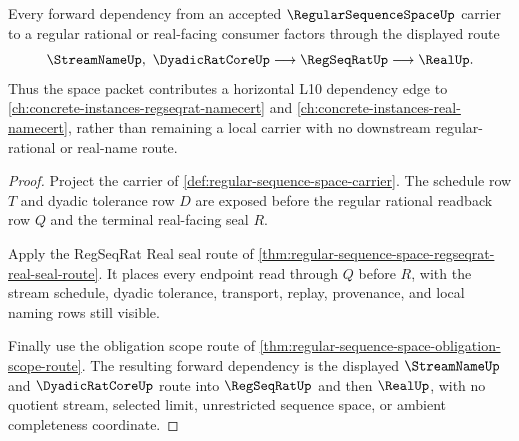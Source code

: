 \begin{theorem}
\label{thm:regular-sequence-space-regseqrat-forward-route}
Every forward dependency from an accepted $\RegularSequenceSpaceUp$ carrier to a regular rational or real-facing consumer factors through the displayed route
$$
\StreamNameUp,\ \DyadicRatCoreUp \longrightarrow \RegSeqRatUp \longrightarrow \RealUp .
$$
Thus the space packet contributes a horizontal L10 dependency edge to \autoref{ch:concrete-instances-regseqrat-namecert} and \autoref{ch:concrete-instances-real-namecert}, rather than remaining a local carrier with no downstream regular-rational or real-name route.
\end{theorem}
\begin{proof}
Project the carrier of \autoref{def:regular-sequence-space-carrier}. The schedule row $T$ and dyadic tolerance row $D$ are exposed before the regular rational readback row $Q$ and the terminal real-facing seal $R$.

Apply the RegSeqRat Real seal route of \autoref{thm:regular-sequence-space-regseqrat-real-seal-route}. It places every endpoint read through $Q$ before $R$, with the stream schedule, dyadic tolerance, transport, replay, provenance, and local naming rows still visible.

Finally use the obligation scope route of \autoref{thm:regular-sequence-space-obligation-scope-route}. The resulting forward dependency is the displayed $\StreamNameUp$ and $\DyadicRatCoreUp$ route into $\RegSeqRatUp$ and then $\RealUp$, with no quotient stream, selected limit, unrestricted sequence space, or ambient completeness coordinate.
\end{proof}

